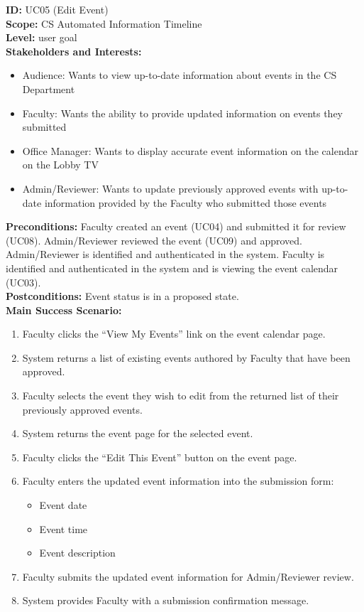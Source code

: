 \textbf{ID:} UC05 (Edit Event) \\
\textbf{Scope:} CS Automated Information Timeline \\
\textbf{Level:} user goal \\
\textbf{Stakeholders and Interests:}
\begin{itemize}
    \item Audience: Wants to view up-to-date information about events in the CS Department
    \item Faculty: Wants the ability to provide updated information on events they submitted
    \item Office Manager: Wants to display accurate event information on the calendar on the Lobby TV
    \item Admin/Reviewer: Wants to update previously approved events with up-to-date information provided by the Faculty who submitted those events
\end{itemize}
\textbf{Preconditions:} Faculty created an event (UC04) and submitted it for review (UC08). Admin/Reviewer reviewed the event (UC09) and approved. Admin/Reviewer is identified and authenticated in the system. Faculty is identified and authenticated in the system and is viewing the event calendar (UC03). \\
\textbf{Postconditions:} Event status is in a proposed state. \\
\textbf{Main Success Scenario:}
\begin{enumerate}
    \item Faculty clicks the ``View My Events'' link on the event calendar page.
    \item System returns a list of existing events authored by Faculty that have been approved.
    \item Faculty selects the event they wish to edit from the returned list of their previously approved events.
    \item System returns the event page for the selected event.
    \item Faculty clicks the “Edit This Event” button on the event page.
    \item Faculty enters the updated event information into the submission form:
          \begin{itemize}
              \item Event date
              \item Event time
              \item Event description
          \end{itemize}
    \item Faculty submits the updated event information for Admin/Reviewer review.
    \item System provides Faculty with a submission confirmation message.
\end{enumerate}
